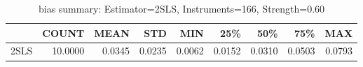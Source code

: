 \begin{table}[ht]
\centering
\caption{bias summary: Estimator=2SLS, Instruments=166, Strength=0.60}
\begin{tabular}{lrrrrrrrr}
\toprule
 & COUNT & MEAN & STD & MIN & 25\% & 50\% & 75\% & MAX \\
\midrule
2SLS & 10.0000 & 0.0345 & 0.0235 & 0.0062 & 0.0152 & 0.0310 & 0.0503 & 0.0793 \\
\bottomrule
\end{tabular}
\end{table}
